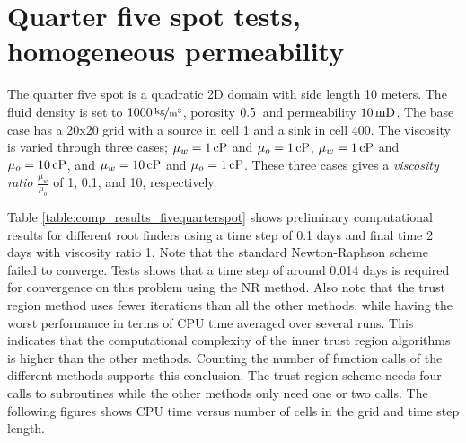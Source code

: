 \documentclass[a4paper,12pt]{report}
\begin{document}
\section{Quarter five spot tests, homogeneous permeability}
The quarter five spot is a quadratic 2D domain with side length 10 meters. The fluid density is set to $\unitfrac[1000]{kg}{m^3}$, porosity $\unit[0.5]{}$ and permeability $\unit[10]{mD}$. The base case has a 20x20 grid with a source in cell 1 and a sink in cell 400. The viscosity is varied through three cases; $\mu_w = \unit[1]{cP}$ and $\mu_o= \unit[1]{cP}$, $\mu_w = \unit[1]{cP}$ and $\mu_o= \unit[10]{cP}$, and $\mu_w = \unit[10]{cP}$ and $\mu_o= \unit[1]{cP}$. These three cases gives a \emph{viscosity ratio} $\frac{\mu_w}{\mu_o}$ of 1, 0.1, and 10, respectively.

Table \ref{table:comp_results_fivequarterspot} shows preliminary computational results for different root finders using a time step of 0.1 days and final time 2 days with viscosity ratio 1. Note that the standard Newton-Raphson scheme failed to converge. Tests shows that a time step of around 0.014 days is required for convergence on this problem using the NR method. Also note that the trust region method uses fewer iterations than all the other methods, while having the worst performance in terms of CPU time averaged over several runs. This indicates that the computational complexity of the inner trust region algorithms is higher than the other methods. Counting the number of function calls of the different methods supports this conclusion. The trust region scheme needs four calls to subroutines while the other methods only need one or two calls. The following figures shows CPU time versus number of cells in the grid and time step length.
 
\end{document}
